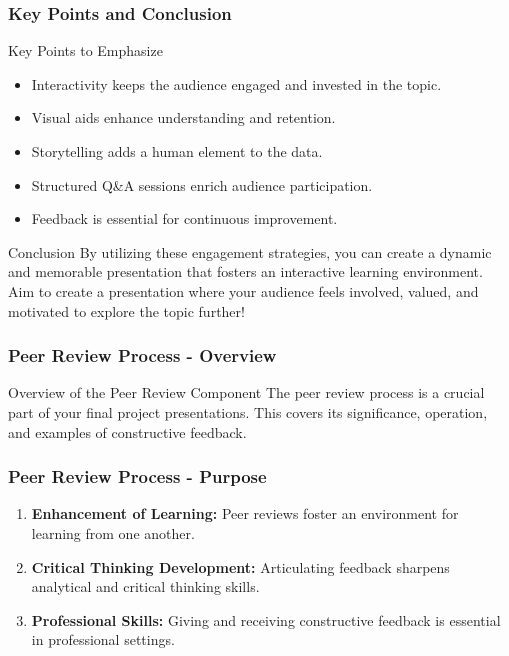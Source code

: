\documentclass[aspectratio=169]{beamer}
\begin{document}
\begin{frame}[fragile]
    \frametitle{Key Points and Conclusion}
    \begin{block}{Key Points to Emphasize}
        \begin{itemize}
            \item Interactivity keeps the audience engaged and invested in the topic.
            \item Visual aids enhance understanding and retention.
            \item Storytelling adds a human element to the data.
            \item Structured Q\&A sessions enrich audience participation.
            \item Feedback is essential for continuous improvement.
        \end{itemize}
    \end{block}

    \begin{block}{Conclusion}
        By utilizing these engagement strategies, you can create a dynamic and memorable presentation that fosters an interactive learning environment. Aim to create a presentation where your audience feels involved, valued, and motivated to explore the topic further!
    \end{block}
\end{frame}

\begin{frame}[fragile]
    \frametitle{Peer Review Process - Overview}
    \begin{block}{Overview of the Peer Review Component}
        The peer review process is a crucial part of your final project presentations. This covers its significance, operation, and examples of constructive feedback.
    \end{block}
\end{frame}

\begin{frame}[fragile]
    \frametitle{Peer Review Process - Purpose}
    \begin{enumerate}
        \item \textbf{Enhancement of Learning:} 
            Peer reviews foster an environment for learning from one another.
        \item \textbf{Critical Thinking Development:} 
            Articulating feedback sharpens analytical and critical thinking skills.
        \item \textbf{Professional Skills:} 
            Giving and receiving constructive feedback is essential in professional settings.
    \end{enumerate}
\end{frame}
\end{document}

